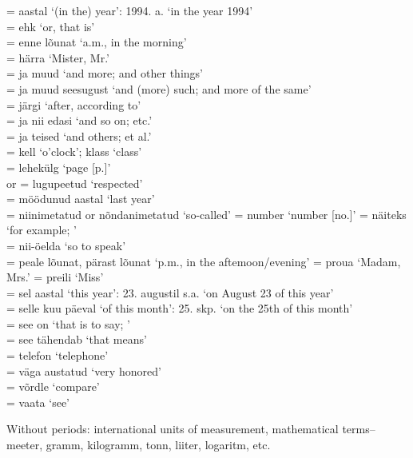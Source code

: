 	\oneColumnTable
	 								= aastal `(in the) year': 1994. a. `in the year 1994' \\
	 								= ehk `or, that is' \\
	 							= enne lõunat `a.m., in the morning' \\
	 							= härra `Mister, Mr.' \\
	 							= ja muud `and more; and other things' \\
	 							= ja muud seesugust `and (more) such; and more of the same' \\
	 								= järgi `after, according to' \\
	 							= ja nii edasi `and so on; etc.' \\
	 							= ja teised `and others; et al.' \\
	 							= kell `o'clock'; klass `class' \\
	 							= lehekülg `page [p.]' \\
	 or  	= lugupeetud `respected' \\
		 						= möödunud aastal `last year' \\
	 							= niinimetatud or nõndanimetatud `so-called' 
	 							= number `number [no.]' 
	 						= näiteks `for example; \eg' \\
	 							= nii-öelda `so to speak' \\
	 							= peale lõunat, pärast lõunat `p.m., in the aftemoon/evening' 
	 							= proua `Madam, Mrs.' 
	 							= preili `Miss' \\
	 							= sel aastal `this year': 23. augustil s.a. `on August 23 of this year' \\
	 							= selle kuu päeval `of this month': 25. skp. `on the 25th of this month' \\
	 							= see on `that is to say; \ie' \\
	 							= see tähendab `that means' \\
	 							= telefon `telephone' \\
	 							= väga austatud `very honored' \\
	 							= võrdle `compare' \\
	 							= vaata `see' \\
	\tableEnd

Without periods: international units of measurement, mathematical terms-- meeter,  gramm,  kilogramm,  tonn,  liiter,  logaritm, etc.

\Vocabulary %

\Exercises %

\Expressions %

\AnswersToExercises %